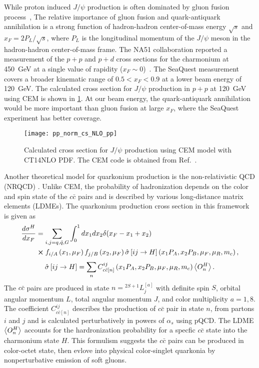 \documentclass[../main.tex]{subfiles}
\begin{document}
While proton induced $J/\psi$ production is often dominated by gluon fusion
process~\cite{vogt1999}, The relative importance of gluon fusion
and quark-antiquark annihilation is a strong function of hadron-hadron center-of-mass energy $\sqrt{s}$
and $x_F=2P_L/\sqrt{s}$, where $P_L$ is the longitudinal momentum of the $J/\psi$ meson in the
hadron-hadron center-of-mass frame.
The NA51 collaboration reported a measurement of the $p+p$ and $p+d$ cross sections
for the charmonium at \SI{450}{\GeV} at a single value of rapidity ($x_F\sim 0$)~\cite{abreu1998}.
The SeaQuest measurement covers a broader kinematic range of $0.5<x_F<0.9$ at a lower beam energy
of \SI{120}{\GeV}.
The calculated cross section for $J/\psi$ production in $p+p$ at \SI{120}{\GeV} using
CEM is shown in \cref{fig:cem_cs}.
At our beam energy, the quark-antiquark annihilation would be more important than gluon fusion at large $x_F$, where
the SeaQuest experiment has better coverage.
\begin{figure}[h!]
	\centering
	\texttt{[image: pp\_norm\_cs\_NLO\_pp]}
	\caption{Calculated cross section for $J/\psi$ production using CEM model with CT14NLO PDF.
		The CEM code is obtained from Ref.~\cite{mangano1993}.}
	\label{fig:cem_cs}
\end{figure}

Another theoretical model for quarkonium production is the non-relativistic
QCD (NRQCD) \cite{bodwin1995}. Unlike CEM, the probability of
hadronization depends on the color and spin state of the $c\bar{c}$ pairs and
is described by various long-distance matrix elements (LDMEs). The quarkonium
production cross section in this framework is given as
\begin{equation}
	\begin{split}
		\frac{d\sigma^H}{dx_F} & =\sum_{i,j = q,\bar{q},G}\int^1_0 dx_1 dx_2 \delta(x_F-x_1+x_2)                                                                                        \\
		                       & \cross f_{i/A}\left(x_1,\mu_F\right)f_{j/B}\left(x_2,\mu_F\right)\hat{\sigma}\left[ij\rightarrow H\right]\left(x_1P_A,x_2P_B,\mu_F,\mu_R , m_c\right),
	\end{split}
\end{equation}
\begin{equation}
	\hat{\sigma}\left[ij\rightarrow H\right]= \sum_n C^{ij}_{c\bar{c}\left[n\right]}\left(x_1P_A,x_2P_B,\mu_F,\mu_R , m_c\right)\expval{O^H_n}.
\end{equation}
The $c\bar{c}$ pairs are produced in state $n={^{2S+1}L_j^{\left[a\right]}}$ with definite spin $S$,
orbital angular momentum $L$, total angular momentum $J$, and color multiplicity $a=1,8$.
The coefficient $C^{ij}_{c\bar{c}\left[n\right]}$ describes the production of $c\bar{c}$ pair in state $n$,
from partons $i$ and $j$ and is calculated perturbatively in powers of $\alpha_s$ using pQCD.
The LDME $\expval{O^H_n}$ accounts for the hardronization probability for a specfic $c\bar{c}$ state into the
charmonium state $H$.
This formulism suggests the $c\bar{c}$ pairs can be produced in color-octet state,
then evlove into physical color-singlet quarkonia by nonperturbative emission of soft gluons.
\end{document}
